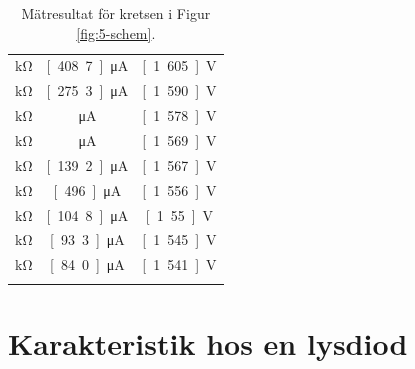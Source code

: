 \documentclass[11pt,a4paper]{article}
\begin{document}
\begin{longtable}[c]{@{}ccc@{}}
\unit[20]{\si{\kohm}} & \unit[408.7]{\si{\unit{\uA}}} & \unit[1.605]{\si{\volt}}
\\\addlinespace
\unit[30]{\si{\kohm}} & \unit[275.3]{\si{\unit{\uA}}} & \unit[1.590]{\si{\volt}}
\\\addlinespace
\unit[40]{\si{\kohm}} & \unit[2077]{\si{\unit{\uA}}} & \unit[1.578]{\si{\volt}}
\\\addlinespace
\unit[50]{\si{\kohm}} & \unit[1667]{\si{\unit{\uA}}} & \unit[1.569]{\si{\volt}}
\\\addlinespace
\unit[60]{\si{\kohm}} & \unit[139.2]{\si{\unit{\uA}}} & \unit[1.567]{\si{\volt}}
\\\addlinespace
\unit[70]{\si{\kohm}} & \unit[496.]{\si{\unit{\uA}}} & \unit[1.556]{\si{\volt}}
\\\addlinespace
\unit[80]{\si{\kohm}} & \unit[104.8]{\si{\unit{\uA}}} & \unit[1.55]{\si{\volt}}
\\\addlinespace
\unit[90]{\si{\kohm}} & \unit[93.3]{\si{\unit{\uA}}} & \unit[1.545]{\si{\volt}}
\\\addlinespace
\unit[100]{\si{\kohm}} & \unit[84.0]{\si{\unit{\uA}}} & \unit[1.541]{\si{\volt}}
\\\addlinespace
\bottomrule
\addlinespace
\caption[]{Mätresultat för kretsen i Figur \ref{fig:5-schem}.}
\label{emktable}
\end{longtable}

%


\section{Karakteristik hos en lysdiod}\label{}


\end{document}
